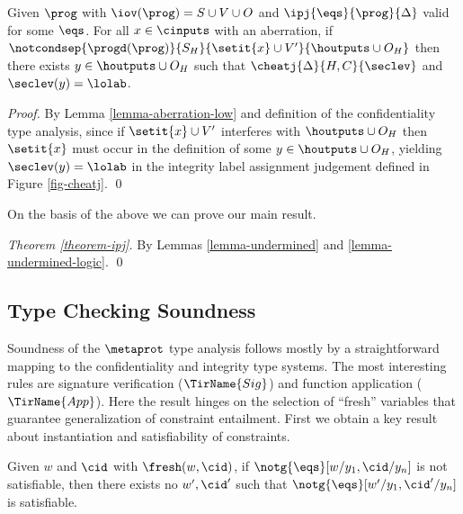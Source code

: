 \begin{lemma}
  \label{lemma-undermined}
  Given $\prog$ with $\iov(\prog) = S \cup V \cup O$ and
  $\ipj{\eqs}{\prog}{\Delta}$ valid for some $\eqs$.  For all $x \in
  \cinputs$ with an aberration, if
  $\notcondsep{\progd(\prog)}{S_H}{\setit{x} \cup V'}{\houtputs \cup O_H}$
  then there exists $y \in \houtputs \cup O_H$ such that
  $\cheatj{\Delta}{H,C}{\seclev}$ and $\seclev(y) = \lolab$.
\end{lemma}
\begin{proof}
  By Lemma \ref{lemma-aberration-low} and definition of the
  confidentiality type analysis, since if $\setit{x} \cup V'$
  interferes with $\houtputs \cup O_H$ then $\setit{x}$
  must occur in the definition of some $y \in \houtputs \cup O_H$,
  yielding $\seclev(y) = \lolab$ in the integrity label assignment
  judgement defined in Figure \ref{fig-cheatj}. \qed
\end{proof}
On the basis of the above we can prove our main result. 
\begin{proof}[Theorem \ref{theorem-ipj}]
  By Lemmas \ref{lemma-undermined} and \ref{lemma-undermined-logic}. \qed
\end{proof}

\subsection{Type Checking Soundness}

Soundness of the $\metaprot$ type analysis follows mostly by a
straightforward mapping to the confidentiality and integrity type
systems. The most interesting rules are signature verification
($\TirName{Sig}$) and function application ($\TirName{App}$). 
Here the result hinges on the selection of ``fresh'' variables
that guarantee generalization of constraint entailment.
First we obtain a key result about instantiation and
satisfiability of constraints. 
\begin{lemma}
  \label{lemma-fresh}
  Given $w$ and $\cid$ with $\fresh(w,\cid)$, if $\notg{\eqs}[w/y_1,\cid/y_n]$
  is not satisfiable, then there exists no $w',\cid'$ such that
  $\notg{\eqs}[w'/y_1,\cid'/y_n]$ is satisfiable.
\end{lemma}

